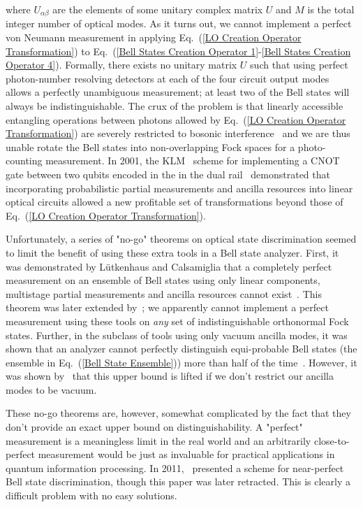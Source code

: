\documentclass[aps,pra,twocolumn,showpacs,superscriptaddress,floatfix,10pt]{revtex4}
\begin{document}
where $U_{\alpha \beta}$ are the elements of some unitary complex matrix $U$ and $M$ is the total integer number of optical modes. As it turns out, we cannot implement a perfect von Neumann measurement in applying Eq.~(\ref{LO Creation Operator Transformation}) to Eq.~(\ref{Bell States Creation Operator 1}-\ref{Bell States Creation Operator 4}). Formally, there exists no unitary matrix $U$ such that using perfect photon-number resolving detectors at each of the four circuit output modes allows a perfectly unambiguous measurement; at least two of the Bell states will always be indistinguishable. The crux of the problem is that linearly accessible entangling operations between photons allowed by Eq.~(\ref{LO Creation Operator Transformation}) are severely restricted to bosonic interference~\cite{Review Paper} and we are thus unable rotate the Bell states into non-overlapping Fock spaces for a photo-counting measurement. In 2001, the KLM~\cite{KLM,KLM2} scheme for implementing a CNOT gate between two qubits encoded in the in the dual rail~\cite{Review Paper} demonstrated that incorporating probabilistic partial measurements and ancilla resources into linear optical circuits allowed a new profitable set of transformations beyond those of Eq.~(\ref{LO Creation Operator Transformation}). 

Unfortunately, a series of "no-go" theorems on optical state discrimination seemed to limit the benefit of using these extra tools in a  Bell state analyzer. First, it was demonstrated by L\"utkenhaus and Calsamiglia that a completely perfect measurement on an ensemble of Bell states using only linear components, multistage partial measurements and ancilla resources cannot exist~\cite{Lutkenhaus}. This theorem was later extended by~\cite{Carollo}; we apparently cannot implement a perfect measurement using these tools on \textit{any} set of indistinguishable orthonormal Fock states. Further, in the subclass of tools using only vacuum ancilla modes, it was shown that an analyzer cannot perfectly distinguish equi-probable Bell states (the ensemble in Eq.~(\ref{Bell State Ensemble})) more than half of the time~\cite{Calsamiglia}. However, it was shown by~\cite{Ewert} that this upper bound is lifted if we don't restrict our ancilla modes to be vacuum.

These no-go theorems are, however, somewhat complicated by the fact that they don't provide an exact upper bound on distinguishability. A "perfect" measurement is a meaningless limit in the real world and an arbitrarily close-to-perfect measurement would be just as invaluable for practical applications in quantum information processing. In 2011,~\cite{Pavicic} presented a scheme for near-perfect Bell state discrimination, though this paper was later retracted. This is clearly a difficult problem with no easy solutions.
\end{document}
